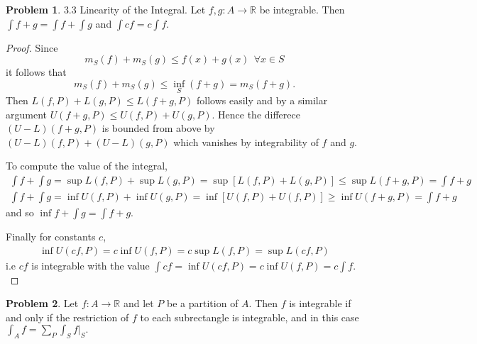 \documentclass[20pt]{article}
\theoremstyle{plain}
\theoremstyle{definition}
\newtheorem*{problem}{Problem}
\newcommand{\reals}{\mathbb{R}}
\begin{document}
\begin{problem}{3.3 Linearity of the Integral.}
  Let $f, g: A \to \reals$ be integrable.
  Then $\int f+g  = \int f + \int g$ and $\int cf =c\int f$.
\end{problem}

\begin{proof}
  Since 
  $$m_S(f) + m_S(g) \leq f(x) + g(x) \ \ \forall x \in S$$
  it follows that
  $$m_S(f) + m_S(g) \leq \inf_{S}(f + g) = m_S(f + g).$$
  Then $L(f, P) + L(g, P) \leq L(f + g, P)$ follows easily and by a similar argument 
  $U(f + g, P) \leq U(f, P) + U(g, P).$  Hence the differece 
  $(U-L)(f + g, P)$ is bounded from above by $(U-L)(f, P) + (U-L)(g, P)$ 
  which vanishes by integrability of $f$ and $g$.

  To compute the value of the integral, 
  \begin{align*}
    \int f + \int g = \sup L(f, P) + \sup L(g, P) = \sup[ L(f, P) + L(g, P) ] 
    \leq \sup L (f + g, P) = \int f + g \\
    \int f + \int g = \inf U(f, P) + \inf U(g, P) = \inf[ U(f, P) + U(f, P) ]
    \geq \inf U(f + g, P) = \int f + g
  \end{align*}
  and so $\inf f + \int g = \int f + g.$

  Finally for constants $c$, 
  \begin{align*}
    \inf U(cf, P) = c \inf U(f, P) = c \sup L(f, P) = \sup L(cf, P)
  \end{align*}
  i.e $cf$ is integrable with the value 
  $\int cf = \inf U(cf, P) = c \inf U(f, P) = c \int f.$
\end{proof}



\begin{problem}{3.4}
  Let $f: A\to \reals$ and let $P$ be a partition of $A$. Then $f$ is integrable
  if and only if the restriction of $f$ to each subrectangle is integrable, 
  and in this case $\int_A f = \sum_P \int_S f|_S.$
\end{problem}
\end{document}
